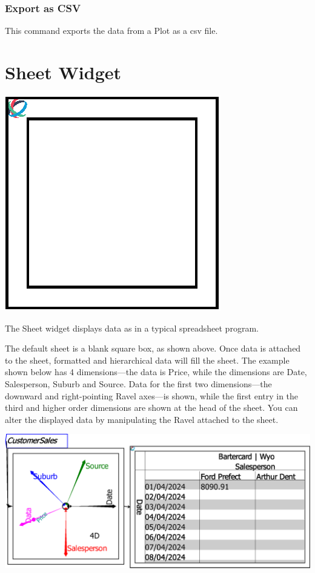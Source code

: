 \subsubsection{Export as CSV}

This command exports the data from a Plot as a csv file.

\section{Sheet Widget}

\label{Sheet}

\includegraphics{images/SheetBlank'}

The Sheet widget displays data as in a typical spreadsheet program.

The default sheet is a blank square box, as shown above. Once data
is attached to the sheet, formatted and hierarchical data will fill
the sheet. The example shown below has 4 dimensions---the data is
Price, while the dimensions are Date, Salesperson, Suburb and Source.
Data for the first two dimensions---the downward and right-pointing
Ravel axes---is shown, while the first entry in the third and higher
order dimensions are shown at the head of the sheet. You can alter
the displayed data by manipulating the Ravel attached to the sheet.

\includegraphics{images/sheetBasics}

